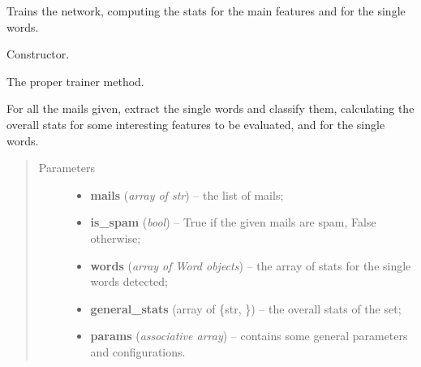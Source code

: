 \documentclass[letterpaper,10pt,english]{sphinxmanual}
\begin{document}
\begin{fulllineitems}
\label{index:trainer.Trainer}
Trains the network, computing the stats for the main features
and for the single words.

\begin{fulllineitems}
\label{index:trainer.Trainer.__init__}
Constructor.

\end{fulllineitems}


\begin{fulllineitems}
\label{index:trainer.Trainer.train}
The proper trainer method.

For all the mails given, extract the single words and classify them,
calculating the overall stats for some interesting features to be
evaluated, and for the single words.
\begin{quote}\begin{description}
\item[{Parameters}] \leavevmode\begin{itemize}
\item {} 
\textbf{mails} (\emph{array of str}) -- the list of mails;

\item {} 
\textbf{is\_spam} (\emph{bool}) -- True if the given mails are spam, False otherwise;

\item {} 
\textbf{words} (\emph{array of Word objects}) -- the array of stats for the single words detected;

\item {} 
\textbf{general\_stats} (array of \{str, {\hyperref[index:gen_stat.Stat]{}}\}) -- the overall stats of the set;

\item {} 
\textbf{params} (\emph{associative array}) -- contains some general parameters and configurations.

\end{itemize}

\end{description}\end{quote}


\end{fulllineitems}
\end{fulllineitems}
\end{document}
